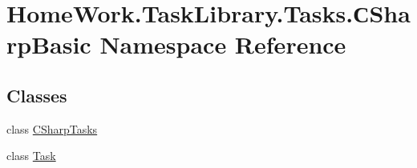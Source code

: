 \hypertarget{namespace_home_work_1_1_task_library_1_1_tasks_1_1_xD0_xA1_sharp_basic}{}\section{Home\+Work.\+Task\+Library.\+Tasks.\+С\+Sharp\+Basic Namespace Reference}
\label{namespace_home_work_1_1_task_library_1_1_tasks_1_1_xD0_xA1_sharp_basic}
\subsection*{Classes}
\begin{DoxyCompactItemize}
\item 
class \mbox{\hyperlink{class_home_work_1_1_task_library_1_1_tasks_1_1_xD0_xA1_sharp_basic_1_1_c_sharp_tasks}{C\+Sharp\+Tasks}}
\item 
class \mbox{\hyperlink{class_home_work_1_1_task_library_1_1_tasks_1_1_xD0_xA1_sharp_basic_1_1_task}{Task}}
\end{DoxyCompactItemize}
